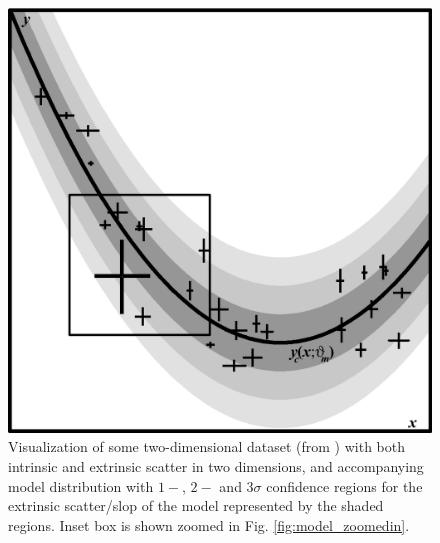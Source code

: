\begin{figure}
    \centering
    \includegraphics[width=0.8\linewidth]{figures/model.eps}
    \caption{Visualization of some two-dimensional dataset (from \textcite{trotter}) with both intrinsic and extrinsic scatter in two dimensions, and accompanying model distribution with $1-$, $2-$ and $3\sigma$ confidence regions for the extrinsic scatter/slop of the model represented by the shaded regions. Inset box is shown zoomed in Fig. \ref{fig:model_zoomedin}.}
    \label{fig:model}
\end{figure}

